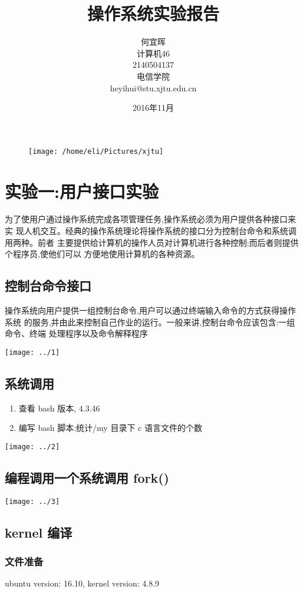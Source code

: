 \documentclass{article}
\date{2016年11月}
\title{操作系统实验报告}
\author{何宜晖\\计算机46\\2140504137\\电信学院\\heyihui@stu.xjtu.edu.cn}
\begin{document}
\begin{CJK}{UTF8}{gkai}
\begin{figure}
\centering
\texttt{[image: /home/eli/Pictures/xjtu]}
\end{figure}


\maketitle
\clearpage
\section{实验一:用户接口实验}
为了使用户通过操作系统完成各项管理任务,操作系统必须为用户提供各种接口来实
现人机交互。经典的操作系统理论将操作系统的接口分为控制台命令和系统调用两种。前者
主要提供给计算机的操作人员对计算机进行各种控制;而后者则提供个程序员,使他们可以
方便地使用计算机的各种资源。
\subsection{控制台命令接口}
操作系统向用户提供一组控制台命令,用户可以通过终端输入命令的方式获得操作系统
的服务,并由此来控制自己作业的运行。一般来讲,控制台命令应该包含:一组命令、终端
处理程序以及命令解释程序

\texttt{[image: ../1]}
\subsection{系统调用}
\begin{enumerate}
\item 查看 bash 版本, 4.3.46
\item 编写 bash 脚本:统计/my 目录下 c 语言文件的个数
\end{enumerate}

\texttt{[image: ../2]}

\subsection{编程调用一个系统调用 fork()}
\texttt{[image: ../3]}

\subsection{kernel 编译}
\subsubsection{文件准备}
ubuntu version: 16.10, kernel version: 4.8.9


\end{CJK}
\end{document}
